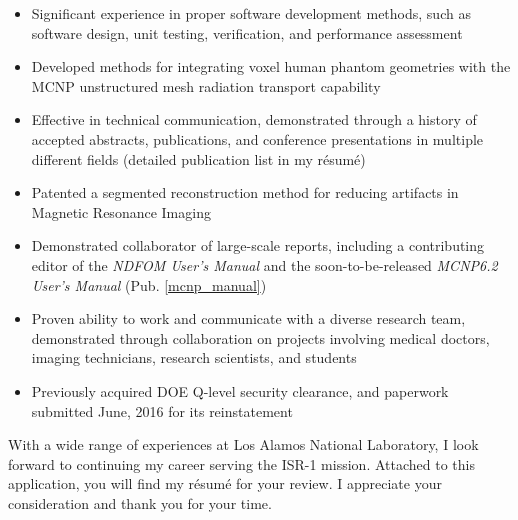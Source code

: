 \begin{center}
\begin{minipage}{\textwidth}
\begin{itemize}[leftmargin=.15in,rightmargin=.25in,itemsep=1.0mm]
	\item Significant experience in proper software development methods, such as software design, unit testing, verification, and performance assessment
	\item Developed methods for integrating voxel human phantom geometries with the \textsc{MCNP} unstructured mesh radiation transport capability
		
	\item Effective in technical communication, demonstrated through a history of accepted abstracts, publications, and conference presentations in multiple different fields (detailed publication list in my r\'{e}sum\'{e})
	\item Patented a segmented reconstruction method for reducing artifacts in Magnetic Resonance Imaging
	\item Demonstrated collaborator of large-scale reports, including a contributing editor of the \textit{NDFOM User's Manual} and the soon-to-be-released \textit{MCNP6.2 User's Manual} (Pub. \ref{mcnp_manual})
	
	\item Proven ability to work and communicate with a diverse research team, demonstrated through collaboration on projects involving medical doctors, imaging technicians, research scientists, and students
		
	\item Previously acquired DOE Q-level security clearance, and paperwork submitted June, 2016 for its reinstatement
  \end{itemize} 

  \vspace{3mm}
  With a wide range of experiences at Los Alamos National Laboratory, I look forward to continuing my career serving the ISR-1 mission.
  Attached to this application, you will find my r\'{e}sum\'{e} for your review. I appreciate your consideration and thank you for your time.
  

\end{minipage}
\end{center}
